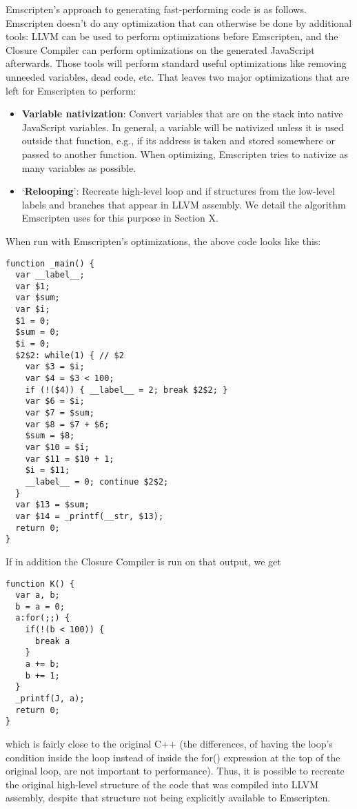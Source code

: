 \documentclass[11pt]{proc}
\begin{document}
Emscripten's approach to generating fast-performing code is as
follows. Emscripten doesn't do any
optimization that can otherwise be done by additional tools:
LLVM can be used to perform optimizations before Emscripten, and
the Closure Compiler can perform optimizations on the generated JavaScript afterwards. Those
tools will perform standard useful optimizations like removing unneeded variables, dead code, etc.
That leaves two major optimizations that are left for Emscripten
to perform:
\begin{itemize}
\item \textbf{Variable nativization}: Convert variables
      that are on the stack into native JavaScript variables. In general,
      a variable will be nativized unless it is used
      outside that function, e.g., if its address is taken and stored somewhere
      or passed to another function. When optimizing, Emscripten tries to nativize
      as many variables as possible.
\item `\textbf{Relooping}': Recreate high-level loop and if structures
      from the low-level labels and branches that appear in LLVM assembly.
      We detail the algorithm Emscripten uses for this purpose in Section X.
\end{itemize}

When run with Emscripten's optimizations, the above code looks
like this:
\begin{verbatim}
function _main() {
  var __label__;
  var $1;
  var $sum;
  var $i;
  $1 = 0;
  $sum = 0;
  $i = 0;
  $2$2: while(1) { // $2
    var $3 = $i;
    var $4 = $3 < 100;
    if (!($4)) { __label__ = 2; break $2$2; }
    var $6 = $i;
    var $7 = $sum;
    var $8 = $7 + $6;
    $sum = $8;
    var $10 = $i;
    var $11 = $10 + 1;
    $i = $11;
    __label__ = 0; continue $2$2;
  }
  var $13 = $sum;
  var $14 = _printf(__str, $13);
  return 0;
}
\end{verbatim}
If in addition the Closure Compiler is run on that output, we get
\begin{verbatim}
function K() {
  var a, b;
  b = a = 0;
  a:for(;;) {
    if(!(b < 100)) {
      break a
    }
    a += b;
    b += 1;
  }
  _printf(J, a);
  return 0;
}
\end{verbatim}
which is fairly close to the original C++ (the differences, of
having the loop's condition inside the loop instead of inside
the for() expression at the top of the original loop, are not important to performance). Thus, it is possible
to recreate the original high-level structure of the code that
was compiled into LLVM assembly, despite that structure not being
explicitly available to Emscripten.
\end{document}

